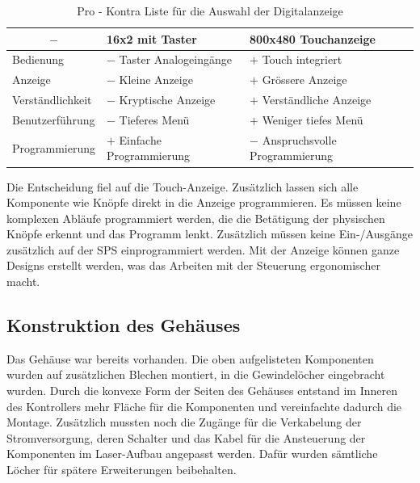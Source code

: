 \begin{table}[H]
    \centering
    \begin{tabular}{l|l|l}
        \multicolumn{1}{c|}{$-$}&        \textbf{16x2 mit Taster}&       \textbf{800x480 Touchanzeige}\\
        \hline
        Bedienung&                      $-$ Taster Analogeingänge&      $+$ Touch integriert\\
        Anzeige&                        $-$ Kleine Anzeige&             $+$ Grössere Anzeige\\
        Verständlichkeit&               $-$ Kryptische Anzeige&         $+$ Verständliche Anzeige\\
        Benutzerführung&                 $-$ Tieferes Menü&              $+$ Weniger tiefes Menü\\
        Programmierung&                 $+$ Einfache Programmierung&    $-$ Anspruchsvolle Programmierung
    \end{tabular}
    \caption{Pro - Kontra Liste für die Auswahl der Digitalanzeige}
    \label{tab:choice_display_hw}
\end{table}

Die Entscheidung fiel auf die Touch-Anzeige. Zusätzlich lassen sich alle Komponente wie Knöpfe direkt in die Anzeige programmieren. Es müssen keine komplexen Abläufe programmiert werden, die die Betätigung der physischen Knöpfe erkennt und das Programm lenkt. Zusätzlich müssen keine Ein-/Ausgänge zusätzlich auf der SPS einprogrammiert werden. Mit der Anzeige können ganze Designs erstellt werden, was das Arbeiten mit der Steuerung ergonomischer macht.

\subsection{Konstruktion des Gehäuses}
Das Gehäuse war bereits vorhanden. Die oben aufgelisteten Komponenten wurden auf zusätzlichen Blechen montiert, in die Gewindelöcher eingebracht wurden. Durch die konvexe Form der Seiten des Gehäuses entstand im Inneren des Kontrollers mehr Fläche für die Komponenten und vereinfachte dadurch die Montage. Zusätzlich mussten noch die Zugänge für die Verkabelung der Stromversorgung, deren Schalter und das Kabel für die Ansteuerung der Komponenten im Laser-Aufbau angepasst werden. Dafür wurden sämtliche Löcher für spätere Erweiterungen beibehalten.

